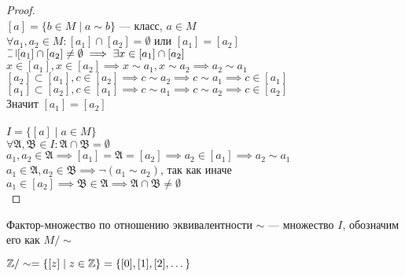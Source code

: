 \begin{normalsize}
\begin{proof}
    \\
    $[a] = \{b \in M \mid a \sim b\}$ --- класс, $a \in M$\\
    $\forall a_1, a_2 \in M : [a_1] \cap [a_2] = \emptyset$ или $[a_1] = [a_2]$
    $\letus [a_1] \cap [a_2] \neq \emptyset \implies \exists x \in [a_1] \cap [a_2]$\\
    $x \in [a_1], x \in [a_2] \implies x \sim a_1, x \sim a_2 \implies a_2 \sim a_1$\\
    $[a_2] \subset [a_1], c \in [a_2] \implies c \sim a_2 \implies c \sim a_1 \implies c \in [a_1]$\\
    $[a_1] \subset [a_2], c \in [a_1] \implies c \sim a_1 \implies c \sim a_2 \implies c \in [a_2]$\\
    Значит $[a_1] = [a_2]$\\\\
    $I = \{[a] \mid a \in M\}$\\
    $\forall \mathfrak{A}, \mathfrak{B} \in I: \mathfrak{A} \cap \mathfrak{B} = \emptyset$\\
    $a_1, a_2 \in \mathfrak{A} \implies [a_1] = \mathfrak{A} = [a_2] \implies a_2 \in [a_1] \implies a_2 \sim a_1$\\ 
    $a_1 \in \mathfrak{A}, a_2 \in \mathfrak{B} \implies \neg(a_1 \sim a_2)$, так как иначе $a_1 \in [a_2] \implies \mathfrak{B} \in \mathfrak{A} \implies \mathfrak{A} \cap \mathfrak{B} \neq \emptyset$\\
\end{proof}

\begin{defn}
    Фактор-множество по отношению эквивалентности $\sim$ --- множество $I$, обозначим его как $M/\sim$
\end{defn}

\begin{example}
    $\mathbb{Z}/\sim = \{[z] \mid z \in \mathbb{Z} \} = \{[0], [1], [2], \dots\}$
\end{example}

\end{normalsize}
